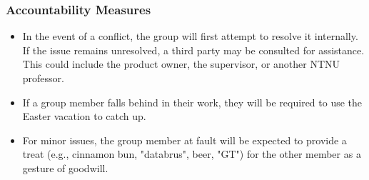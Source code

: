 \subsubsection{Accountability Measures}
\begin{itemize}
    \item In the event of a conflict, the group will first attempt to resolve it internally. If the issue remains unresolved, a third party may be consulted for assistance. This could include the product owner, the supervisor, or another NTNU professor.
    \item If a group member falls behind in their work, they will be required to use the Easter vacation to catch up.
    \item For minor issues, the group member at fault will be expected to provide a treat (e.g., cinnamon bun, "databrus", beer, "GT") for the other member as a gesture of goodwill.
\end{itemize}
